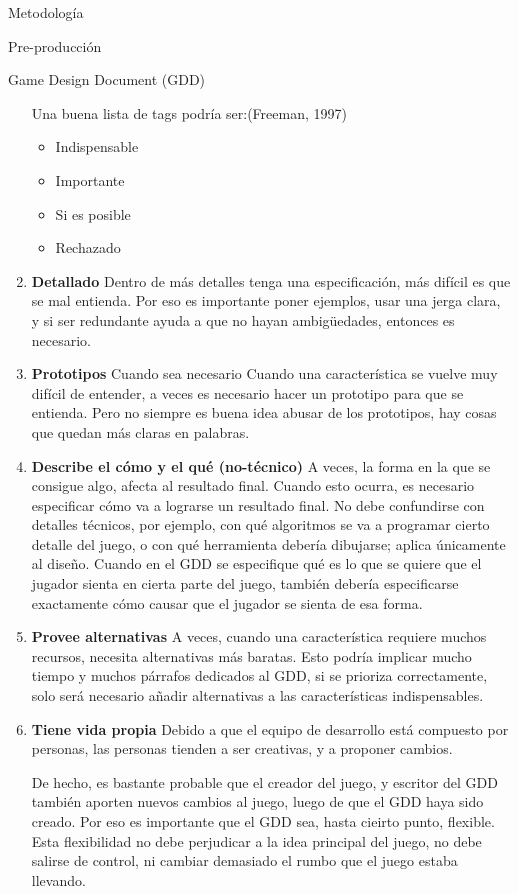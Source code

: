 \begin{section}{Metodología}
\begin{subsection}{Pre-producción}
\begin{subsubsection}{Game Design Document (GDD)}
\begin{enumerate}
        Una buena lista de tags podría ser:(Freeman, 1997)

        \begin{itemize}
        \item Indispensable
        \item Importante
        \item Si es posible
        \item Rechazado
        \end{itemize}

      \item \textbf{Detallado} Dentro de más detalles tenga una especificación, más difícil es que se mal entienda. Por eso es importante poner ejemplos, usar una jerga clara, y si ser redundante ayuda a que no hayan ambigüedades, entonces es necesario.

      \item \textbf{Prototipos} Cuando sea necesario Cuando una característica se vuelve muy difícil de entender, a veces es necesario hacer un prototipo para que se entienda. Pero no siempre es buena idea abusar de los prototipos, hay cosas que quedan más claras en palabras.

      \item \textbf{Describe el cómo y el qué (no-técnico)} A veces, la forma en la que se consigue algo, afecta al resultado final. Cuando esto ocurra, es necesario especificar cómo va a lograrse un resultado final. No debe confundirse con detalles técnicos, por ejemplo, con qué algoritmos se va a programar cierto detalle del juego, o con qué herramienta debería dibujarse; aplica únicamente al diseño. Cuando en el GDD se especifique qué es lo que se quiere que el jugador sienta en cierta parte del juego, también debería especificarse exactamente cómo causar que el jugador se sienta de esa forma.

      \item \textbf{Provee alternativas} A veces, cuando una característica requiere muchos recursos, necesita alternativas más baratas. Esto podría implicar mucho tiempo y muchos párrafos dedicados al GDD, si se prioriza correctamente, solo será necesario añadir alternativas a las características indispensables.

      \item \textbf{Tiene vida propia} Debido a que el equipo de desarrollo está compuesto por personas, las personas tienden a ser creativas, y a proponer cambios.

        De hecho, es bastante probable que el creador del juego, y escritor del GDD también aporten nuevos cambios al juego, luego de que el GDD haya sido creado. Por eso es importante que el GDD sea, hasta cieirto punto, flexible. Esta flexibilidad no debe perjudicar a la idea principal del juego, no debe salirse de control, ni cambiar demasiado el rumbo que el juego estaba llevando.


\end{enumerate}
\end{subsubsection}
\end{subsection}
\end{section}
